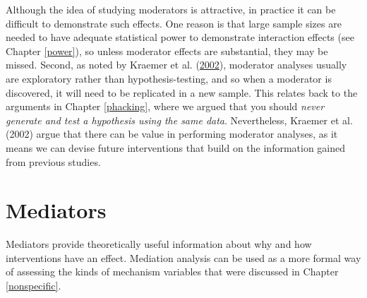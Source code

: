 \documentclass{krantz}
\begin{document}
Although the idea of studying moderators is attractive, in practice it can be difficult to demonstrate such effects. One reason is that large sample sizes are needed to have adequate statistical power to demonstrate interaction effects (see Chapter \ref{power}), so unless moderator effects are substantial, they may be missed. Second, as noted by Kraemer et al. (\protect\hyperlink{ref-kraemer2002}{2002}), moderator analyses usually are exploratory rather than hypothesis-testing, and so when a moderator is discovered, it will need to be replicated in a new sample. This relates back to the arguments in Chapter \ref{phacking}, where we argued that you should \emph{never generate and test a hypothesis using the same data}. Nevertheless, Kraemer et al. (2002) argue that there can be value in performing moderator analyses, as it means we can devise future interventions that build on the information gained from previous studies.

\hypertarget{mediators-1}{%
\section{Mediators}\label{mediators-1}}

Mediators provide theoretically useful information about why and how interventions have an effect. Mediation analysis can be used as a more formal way of assessing the kinds of mechanism variables that were discussed in Chapter \ref{nonspecific}.
\end{document}
